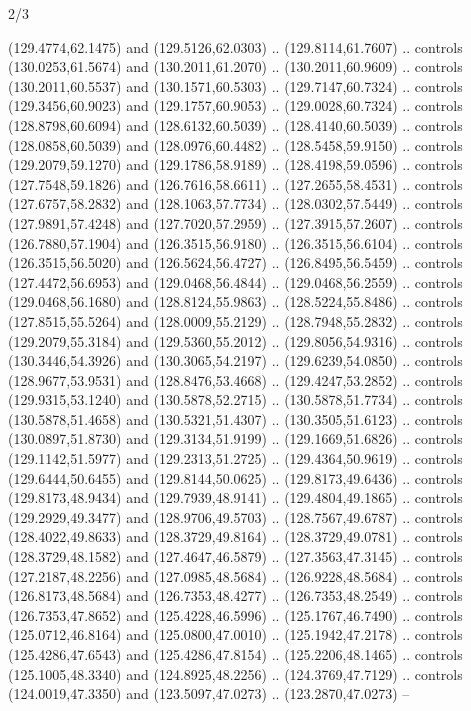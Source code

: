 \begin{flagdescription}{2/3}
\begin{scope}[xshift=0.5\flaglength,yshift=0.5\flagwidth,scale=\flagwidth/180]
\begin{scope}[y=0.8pt, x=0.8pt, yscale=-1,shift={(-168.75,-108.75)}]
  (129.4774,62.1475) and (129.5126,62.0303) .. (129.8114,61.7607) .. controls
  (130.0253,61.5674) and (130.2011,61.2070) .. (130.2011,60.9609) .. controls
  (130.2011,60.5537) and (130.1571,60.5303) .. (129.7147,60.7324) .. controls
  (129.3456,60.9023) and (129.1757,60.9053) .. (129.0028,60.7324) .. controls
  (128.8798,60.6094) and (128.6132,60.5039) .. (128.4140,60.5039) .. controls
  (128.0858,60.5039) and (128.0976,60.4482) .. (128.5458,59.9150) .. controls
  (129.2079,59.1270) and (129.1786,58.9189) .. (128.4198,59.0596) .. controls
  (127.7548,59.1826) and (126.7616,58.6611) .. (127.2655,58.4531) .. controls
  (127.6757,58.2832) and (128.1063,57.7734) .. (128.0302,57.5449) .. controls
  (127.9891,57.4248) and (127.7020,57.2959) .. (127.3915,57.2607) .. controls
  (126.7880,57.1904) and (126.3515,56.9180) .. (126.3515,56.6104) .. controls
  (126.3515,56.5020) and (126.5624,56.4727) .. (126.8495,56.5459) .. controls
  (127.4472,56.6953) and (129.0468,56.4844) .. (129.0468,56.2559) .. controls
  (129.0468,56.1680) and (128.8124,55.9863) .. (128.5224,55.8486) .. controls
  (127.8515,55.5264) and (128.0009,55.2129) .. (128.7948,55.2832) .. controls
  (129.2079,55.3184) and (129.5360,55.2012) .. (129.8056,54.9316) .. controls
  (130.3446,54.3926) and (130.3065,54.2197) .. (129.6239,54.0850) .. controls
  (128.9677,53.9531) and (128.8476,53.4668) .. (129.4247,53.2852) .. controls
  (129.9315,53.1240) and (130.5878,52.2715) .. (130.5878,51.7734) .. controls
  (130.5878,51.4658) and (130.5321,51.4307) .. (130.3505,51.6123) .. controls
  (130.0897,51.8730) and (129.3134,51.9199) .. (129.1669,51.6826) .. controls
  (129.1142,51.5977) and (129.2313,51.2725) .. (129.4364,50.9619) .. controls
  (129.6444,50.6455) and (129.8144,50.0625) .. (129.8173,49.6436) .. controls
  (129.8173,48.9434) and (129.7939,48.9141) .. (129.4804,49.1865) .. controls
  (129.2929,49.3477) and (128.9706,49.5703) .. (128.7567,49.6787) .. controls
  (128.4022,49.8633) and (128.3729,49.8164) .. (128.3729,49.0781) .. controls
  (128.3729,48.1582) and (127.4647,46.5879) .. (127.3563,47.3145) .. controls
  (127.2187,48.2256) and (127.0985,48.5684) .. (126.9228,48.5684) .. controls
  (126.8173,48.5684) and (126.7353,48.4277) .. (126.7353,48.2549) .. controls
  (126.7353,47.8652) and (125.4228,46.5996) .. (125.1767,46.7490) .. controls
  (125.0712,46.8164) and (125.0800,47.0010) .. (125.1942,47.2178) .. controls
  (125.4286,47.6543) and (125.4286,47.8154) .. (125.2206,48.1465) .. controls
  (125.1005,48.3340) and (124.8925,48.2256) .. (124.3769,47.7129) .. controls
  (124.0019,47.3350) and (123.5097,47.0273) .. (123.2870,47.0273) --

\end{scope}
\end{scope}
\end{flagdescription}
